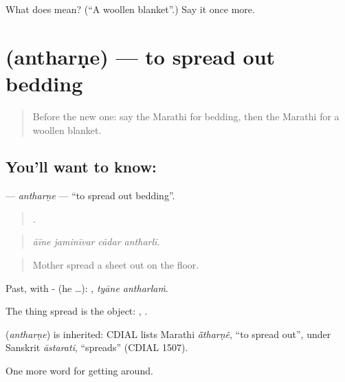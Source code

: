 \begin{tcolorbox}[breakable,colback=teal!4,colframe=teal!35!black,title={Before you move on}]
What does  mean? (\textquotedblleft{}A woollen blanket\textquotedblright{}.) Say it once more.
\end{tcolorbox}
\section[\texorpdfstring{\mr{अंथरणे} (antharṇe)}{अंथरणे (antharṇe)}]{ (antharṇe) — to spread out bedding}

\label{lesson:MR-C415-antharne}



\begin{quote}
Before the new one: say the Marathi for bedding, then the Marathi for a woollen blanket.
\end{quote}

\subsection*{You'll want to know: }
\textbf{} — \emph{antharṇe} — \textquotedblleft{}to spread out bedding\textquotedblright{}.

\begin{quote}
   .
\end{quote}

\begin{quote}
\emph{āīne jaminīvar cādar antharlī.}
\end{quote}

\begin{quote}
Mother spread a sheet out on the floor.
\end{quote}

Past, with - (he …):  , \emph{tyāne antharlaṁ}.

The thing spread is the object:  ,  .

\begin{cousinweb}
\textbf{} (\emph{antharṇe}) is inherited: CDIAL lists Marathi \emph{ā̃tharṇẽ}, \textquotedblleft{}to spread out\textquotedblright{}, under Sanskrit \emph{āstarati}, \textquotedblleft{}spreads\textquotedblright{} (CDIAL 1507).
\end{cousinweb}

\begin{grammarlens}[title={What you've built}]
One more word for getting around.
\end{grammarlens}

